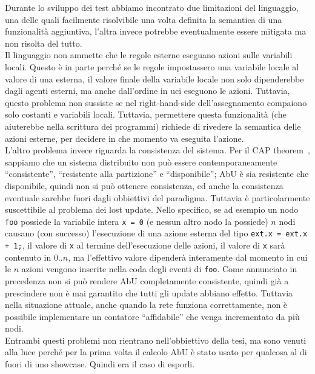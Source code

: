 \documentclass[12pt, a4paper]{article}
\begin{document}
Durante lo sviluppo dei test abbiamo incontrato due limitazioni del linguaggio, una delle quali facilmente risolvibile una volta definita la semantica di una funzionalità aggiuntiva, l'altra invece potrebbe eventualmente essere mitigata ma non risolta del tutto.\\
Il linguaggio non ammette che le regole esterne eseguano azioni sulle variabili locali. Questo è in parte perché se le regole impostassero una variabile locale al valore di una esterna, il valore finale della variabile locale non solo dipenderebbe dagli agenti esterni, ma anche dall'ordine in uci eseguono le azioni. Tuttavia, questo problema non sussiste se nel right-hand-side dell'assegnamento compaiono solo costanti e variabili locali. Tuttavia, permettere questa funzionalità (che aiuterebbe nella scrittura dei programmi) richiede di rivedere la semantica delle azioni esterne, per decidere in che momento va eseguita l'azione.\\
L'altro problema invece riguarda la consistenza del sistema. Per il CAP theorem~\cite{brewer2000towards}, sappiamo che un sistema distribuito non può essere contemporaneamente ``consistente'', ``resistente alla partizione'' e ``disponibile''; AbU è sia resistente che disponibile, quindi non si può ottenere consistenza, ed anche la consistenza eventuale sarebbe fuori dagli obbiettivi del paradigma.
Tuttavia è particolarmente suscettibile al problema dei lost update. Nello specifico, se ad esempio un nodo \lstinline{foo} possiede la variabile intera \lstinline{x = 0} (e nessun altro nodo la possiede) $n$ nodi causano (con successo) l'esecuzione di una azione esterna del tipo \lstinline{ext.x = ext.x + 1;}, il valore di \lstinline{x} al termine dell'esecuzione delle azioni, il valore di \lstinline{x} sarà contenuto in $0..n$, ma l'effettivo valore dipenderà interamente dal momento in cui le $n$ azioni vengono inserite nella coda degli eventi di \lstinline{foo}.
Come annunciato in precedenza non si può rendere AbU completamente consistente, quindi già a prescindere non è mai garantito che tutti gli update abbiano effetto. Tuttavia nella situazione attuale, anche quando la rete funziona correttamente, non è possibile implementare un contatore ``affidabile'' che venga incrementato da più nodi.\\
Entrambi questi problemi non rientrano nell'obbiettivo della tesi, ma sono venuti alla luce perché per la prima volta il calcolo AbU è stato usato per qualcosa al di fuori di uno showcase. Quindi era il caso di esporli.
\end{document}
